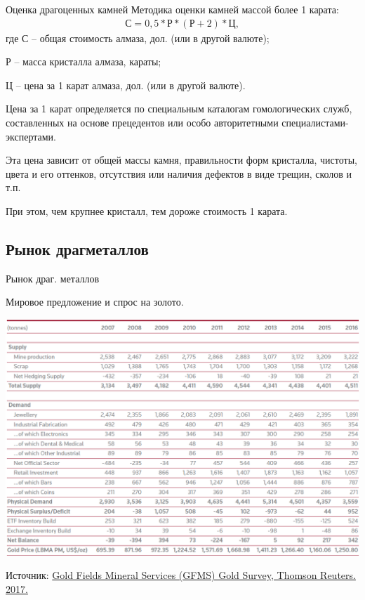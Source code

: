 \documentclass[_Banking_p3.tex]{subfiles}
\begin{document}
\begin{frame}[ allowframebreaks]{Оценка драгоценных камней}
Методика оценки камней массой более 1 карата:
\begin{align}
\text{С} = 0,5 * \text{Р} * (\text{Р} + 2) * \text{Ц},
\end{align}
где	С   – общая стоимость алмаза, дол. (или в другой валюте);

Р   – масса кристалла алмаза, караты; 

Ц  – цена за 1 карат алмаза, дол. (или в другой валюте).

\pagebreak
Цена за 1 карат определяется по специальным каталогам гомологических служб, составленных на основе прецедентов или особо авторитетными специалистами-экспертами. 

Эта цена зависит от общей массы камня, правильности форм кристалла, чистоты, цвета и его оттенков, отсутствия или наличия дефектов в виде трещин, сколов и т.п. 

При этом, чем крупнее кристалл, тем дороже стоимость 1 карата.

\end{frame}

\subsection{Рынок драгметаллов}
\begin{frame}{Рынок драг. металлов}
\begin{table}	
	\centering
	\caption{Мировое предложение и спрос на золото. }
	\includegraphics[scale=0.3]{img/world_gold_supply_and_demand.png}
\label{fig:world_gold_supply_and_demand}
\end{table}
Источник: \href{http://financial-risk-solutions.thomsonreuters.info/GFMS}{Gold Fields Mineral Services (GFMS) Gold Survey, Thomson Reuters. 2017.}
\end{frame}
\end{document}

